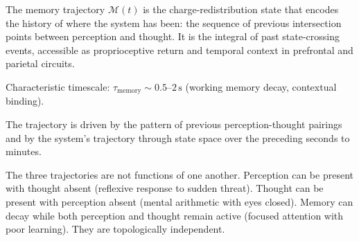 \begin{definition}
\label{def:memory-traj}
The memory trajectory $\mathcal{M}(t)$ is the charge-redistribution state that encodes the history of where the system has been: the sequence of previous intersection points between perception and thought. It is the integral of past state-crossing events, accessible as proprioceptive return and temporal context in prefrontal and parietal circuits.

Characteristic timescale: $\tau_{\text{memory}} \sim 0.5\text{--}2\,\text{s}$ (working memory decay, contextual binding).

The trajectory is driven by the pattern of previous perception-thought pairings and by the system's trajectory through state space over the preceding seconds to minutes.
\end{definition}

\begin{remark}
The three trajectories are not functions of one another. Perception can be present with thought absent (reflexive response to sudden threat). Thought can be present with perception absent (mental arithmetic with eyes closed). Memory can decay while both perception and thought remain active (focused attention with poor learning). They are topologically independent.
\end{remark}

